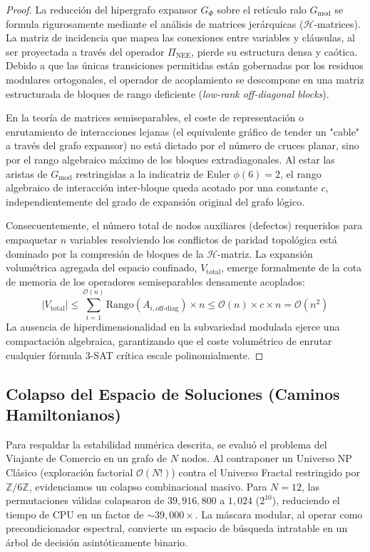 \documentclass[sn-mathphys]{sn-jnl}
\newcommand{\Zmod}{\mathbb{Z}/6\mathbb{Z}}
\begin{document}
\begin{proof}
La reducción del hipergrafo expansor $G_{\Phi}$ sobre el retículo ralo $G_{\text{mod}}$ se formula rigurosamente mediante el análisis de matrices jerárquicas ($\mathcal{H}$-matrices). La matriz de incidencia que mapea las conexiones entre variables y cláusulas, al ser proyectada a través del operador $\Pi_{\text{NEE}}$, pierde su estructura densa y caótica. Debido a que las únicas transiciones permitidas están gobernadas por los residuos modulares ortogonales, el operador de acoplamiento se descompone en una matriz estructurada de bloques de rango deficiente (\textit{low-rank off-diagonal blocks}).

En la teoría de matrices semiseparables, el coste de representación o enrutamiento de interacciones lejanas (el equivalente gráfico de tender un "cable" a través del grafo expansor) no está dictado por el número de cruces planar, sino por el rango algebraico máximo de los bloques extradiagonales. Al estar las aristas de $G_{\text{mod}}$ restringidas a la indicatriz de Euler $\phi(6)=2$, el rango algebraico de interacción inter-bloque queda acotado por una constante $c$, independientemente del grado de expansión original del grafo lógico. 

Consecuentemente, el número total de nodos auxiliares (defectos) requeridos para empaquetar $n$ variables resolviendo los conflictos de paridad topológica está dominado por la compresión de bloques de la $\mathcal{H}$-matriz. La expansión volumétrica agregada del espacio confinado, $V_{\text{total}}$, emerge formalmente de la cota de memoria de los operadores semiseparables densamente acoplados:
\begin{equation}
|V_{\text{total}}| \le \sum_{i=1}^{\mathcal{O}(n)} \text{Rango}(A_{i, \text{off-diag}}) \times n \le \mathcal{O}(n) \times c \times n = \mathcal{O}(n^2)
\end{equation}
La ausencia de hiperdimensionalidad en la subvariedad modulada ejerce una compactación algebraica, garantizando que el coste volumétrico de enrutar cualquier fórmula 3-SAT crítica escale polinomialmente.
\end{proof}

\subsection{Colapso del Espacio de Soluciones (Caminos Hamiltonianos)}
Para respaldar la estabilidad numérica descrita, se evaluó el problema del Viajante de Comercio en un grafo de $N$ nodos. Al contraponer un Universo NP Clásico (exploración factorial $\mathcal{O}(N!)$) contra el Universo Fractal restringido por $\Zmod$, evidenciamos un colapso combinacional masivo. Para $N=12$, las permutaciones válidas colapsaron de $39,916,800$ a $1,024$ ($2^{10}$), reduciendo el tiempo de CPU en un factor de $\sim 39,000\times$. La máscara modular, al operar como precondicionador espectral, convierte un espacio de búsqueda intratable en un árbol de decisión asintóticamente binario.
\end{document}

